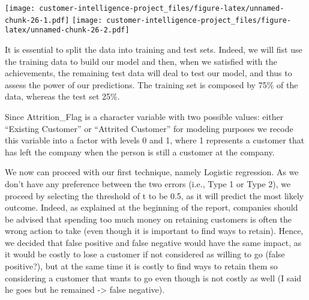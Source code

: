 \documentclass[
]{article}
\begin{document}
\texttt{[image: customer-intelligence-project\_files/figure-latex/unnamed-chunk-26-1.pdf]}
\texttt{[image: customer-intelligence-project\_files/figure-latex/unnamed-chunk-26-2.pdf]}

It is essential to split the data into training and test sets. Indeed,
we will fist use the training data to build our model and then, when we
satisfied with the achievements, the remaining test data will deal to
test our model, and thus to assess the power of our predictions. The
training set is composed by 75\% of the data, whereas the test set 25\%.

Since Attrition\_Flag is a character variable with two possible values:
either ``Existing Customer'' or ``Attrited Customer'' for modeling
purposes we recode this variable into a factor with levels 0 and 1,
where 1 represents a customer that has left the company when the person
is still a customer at the company.

We now can proceed with our first technique, namely Logistic regression.
As we don't have any preference between the two errors (i.e., Type 1 or
Type 2), we proceed by selecting the threshold of t to be 0.5, as it
will predict the most likely outcome. Indeed, as explained at the
beginning of the report, companies should be advised that spending too
much money on retaining customers is often the wrong action to take
(even though it is important to find ways to retain). Hence, we decided
that false positive and false negative would have the same impact, as it
would be costly to lose a customer if not considered as willing to go
(false positive?), but at the same time it is costly to find ways to
retain them so considering a customer that wants to go even though is
not costly as well (I said he goes but he remained -\textgreater{} false
negative).
\end{document}
